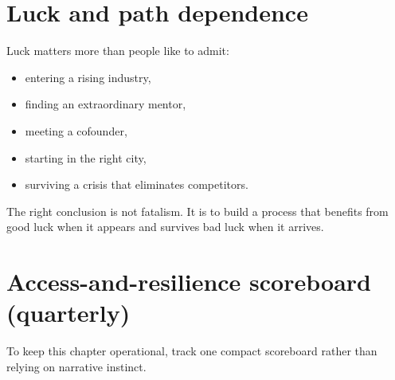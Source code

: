 \documentclass[11pt,openany]{book}
\begin{document}
\section{Luck and path dependence}

Luck matters more than people like to admit:

\begin{itemize}
  \item entering a rising industry,
  \item finding an extraordinary mentor,
  \item meeting a cofounder,
  \item starting in the right city,
  \item surviving a crisis that eliminates competitors.
\end{itemize}

The right conclusion is not fatalism. It is to build a process that benefits from good luck when it appears and survives bad luck when it arrives.

\section{Access-and-resilience scoreboard (quarterly)}

To keep this chapter operational, track one compact scoreboard rather than relying on narrative instinct.
\end{document}
